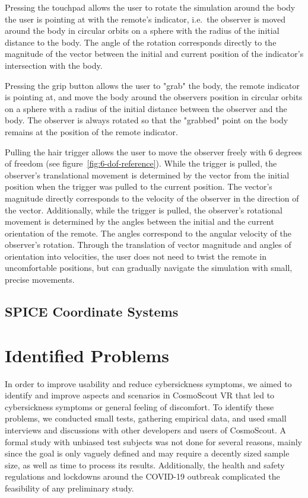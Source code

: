 Pressing the touchpad allows the user to rotate the simulation around the body the user is pointing at with the
remote's indicator, i.e.\ the observer is moved around the body in circular orbits on a sphere with the radius of the
initial distance to the body.
The angle of the rotation corresponds directly to the magnitude of the vector between the initial and current position
of the indicator's intersection with the body.

Pressing the grip button allows the user to "grab" the body, the remote indicator is pointing at, and move the body
around the observers position in circular orbits on a sphere with a radius of the initial distance between the
observer and the body.
The observer is always rotated so that the "grabbed" point on the body remains at the position of the remote indicator.

Pulling the hair trigger allows the user to move the observer freely with 6 degrees of freedom (see
figure~\ref{fig:6-dof-reference}).
While the trigger is pulled, the observer's translational movement is determined by the vector from the initial
position when the trigger was pulled to the current position.
The vector's magnitude directly corresponds to the velocity of the observer in the direction of the vector.
Additionally, while the trigger is pulled, the observer's rotational movement is determined by the angles between the
initial and the current orientation of the remote.
The angles correspond to the angular velocity of the observer's rotation.
Through the translation of vector magnitude and angles of orientation into velocities, the user does not need to
twist the remote in uncomfortable positions, but can gradually navigate the simulation with small, precise movements.

\subsection{SPICE Coordinate Systems}\label{subsec:spice-coordinate-systems}


\section{Identified Problems}\label{sec:identified-problems}

In order to improve usability and reduce cybersickness symptoms, we aimed to identify and improve aspects and
scenarios in CosmoScout VR that led to cybersickness symptoms or general feeling of discomfort.
To identify these problems, we conducted small tests, gathering empirical data, and used small interviews and
discussions with other developers and users of CosmoScout.
A formal study with unbiased test subjects was not done for several reasons, mainly since the goal is only vaguely
defined and may require a decently sized sample size, as well as time to process its results.
Additionally, the health and safety regulations and lockdowns around the COVID-19 outbreak complicated the feasibility
of any preliminary study.

